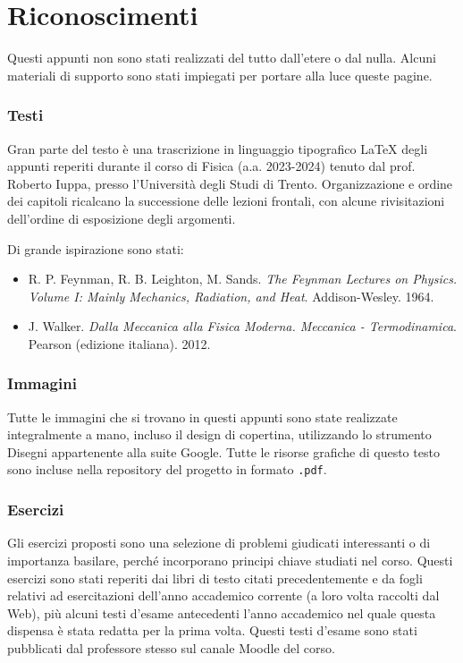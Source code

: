 \section*{Riconoscimenti}
Questi appunti non sono stati realizzati del tutto dall'etere o dal nulla.
Alcuni materiali di supporto sono stati impiegati per portare alla luce
queste pagine.

\subsubsection*{Testi}
Gran parte del testo è una trascrizione in linguaggio tipografico \LaTeX\@
degli appunti reperiti durante
il corso di Fisica (a.a. 2023-2024) tenuto dal prof. Roberto Iuppa, presso
l'Università degli Studi di Trento. Organizzazione e ordine dei
capitoli ricalcano la successione delle lezioni frontali, con alcune
rivisitazioni dell'ordine di esposizione degli argomenti.

Di grande ispirazione sono stati:
\begin{itemize}
    \item R. P. Feynman, R. B. Leighton, M. Sands. \textit{The Feynman Lectures on Physics. Volume I: Mainly Mechanics, Radiation, and Heat}. Addison-Wesley. 1964.
    \item J. Walker. \textit{Dalla Meccanica alla Fisica Moderna. Meccanica - Termodinamica}. Pearson (edizione italiana). 2012.
\end{itemize}

\subsubsection*{Immagini}
Tutte le immagini che si trovano in questi appunti sono state realizzate
integralmente a mano, incluso il design di copertina, utilizzando
lo strumento Disegni appartenente alla suite Google. Tutte le risorse
grafiche di questo testo sono incluse nella repository del progetto in
formato \texttt{.pdf}.

\subsubsection*{Esercizi}
Gli esercizi proposti sono una selezione di problemi
giudicati interessanti o
di importanza basilare, perché incorporano principi chiave studiati nel corso.
Questi esercizi sono stati reperiti dai libri di testo citati precedentemente
e da fogli relativi ad esercitazioni dell'anno accademico corrente (a loro
volta raccolti dal Web), più alcuni testi d'esame antecedenti l'anno accademico
nel quale questa dispensa è stata redatta per la prima volta. Questi testi
d'esame sono stati pubblicati dal professore stesso sul canale Moodle del corso.